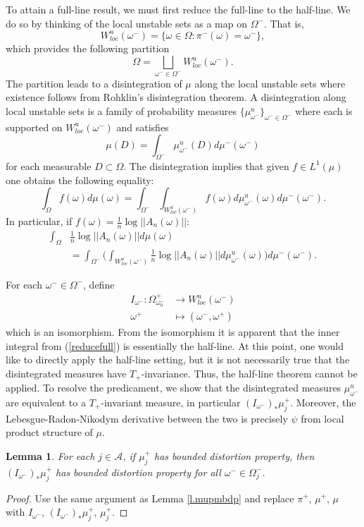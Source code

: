 \documentclass{amsart}
\newtheorem{lemma}{Lemma}
\newcommand{\A}{\mathcal{A}}
\begin{document}
To attain a full-line result, we must first reduce the full-line to the half-line. We do so by thinking of the local unstable sets as a map on $\Omega^-$. That is,
\[W^u_{loc}(\omega^-) = \{\omega\in \Omega: \pi^-(\omega) = \omega^-\},\]
which provides the following partition
\[\Omega = \bigsqcup_{\omega^- \in\Omega^-} W^u_{loc}(\omega^-).\]
The partition leads to a disintegration of $\mu$ along the local unstable sets where existence follows from Rohklin's disintegration theorem. A disintegration along local unstable sets is a family of probability measures $\{\mu_{\omega^-}^u\}_{\omega^-\in\Omega^-}$ where each is supported on $W^u_{loc}(\omega^-)$ and satisfies
\[\mu(D) = \int_{\Omega^-}\mu_{\omega^-}^u(D) d\mu^-(\omega^-)\]
for each measurable $D\subset \Omega$. The disintegration implies that given $f\in L^1(\mu)$ one obtains the following equality:
\[\int_\Omega f(\omega)d\mu(\omega) = \int_{\Omega^-} \int_{W^u_{loc}(\omega^-)} f(\omega)d\mu^u_{\omega^-}(\omega) d\mu^-(\omega^-).\]
In particular, if $f(\omega) = \frac{1}{n}\log||A_n(\omega)||$:
\begin{align}
    \int_\Omega &\frac{1}{n}\log||A_n(\omega)||d\mu(\omega) \label{reducefull}\\
    &= \int_{\Omega^-} \Bigg(\int_{W^u_{loc}(\omega^-)}\frac{1}{n}\log||A_n(\omega)||d\mu^u_{\omega^-}(\omega) \Bigg) d\mu^-(\omega^-).\nonumber
\end{align}

For each $\omega^-\in \Omega^-$, define
\begin{align*}
    I_{\omega^-}: \Omega^+_{\omega^-_0} &\rightarrow W^u_{loc}(\omega^-)\\
    \omega^+ &\mapsto(\omega^-, \omega^+)
\end{align*}
which is an isomorphism. From the isomorphism it is apparent that the inner integral from (\ref{reducefull}) is essentially the half-line. At this point, one would like to directly apply the half-line setting, but it is not necessarily true that the disintegrated measures have $T_+$-invariance. Thus, the half-line theorem cannot be applied. To resolve the predicament, we show that the disintegrated measures $\mu^u_{\omega^-}$ are equivalent to a $T_+$-invariant measure, in particular $(I_{\omega^-})_*\mu^+_j$. Moreover, the Lebesgue-Radon-Nikodym derivative between the two is precisely $\psi$ from local product structure of $\mu$. 

\begin{lemma}\label{l.IpushBD}
    For each $j\in \A$, if $\mu^+_j$ has bounded distortion property, then $(I_{\omega^-})_*\mu^+_j$ has bounded distortion property for all $\omega^- \in \Omega^-_j$.
\end{lemma}
\begin{proof}
    Use the same argument as Lemma \ref{l.mupmbdp} and replace $\pi^+$, $\mu^+$, $\mu$ with $I_{\omega^-}$, $(I_{\omega^-})_*\mu^+_j$, $\mu^+_j$.
\end{proof}
\end{document}
